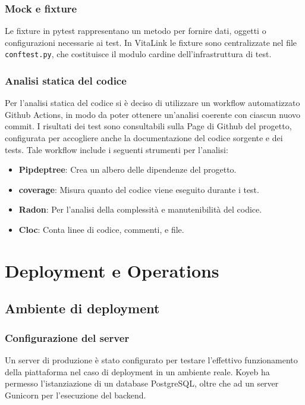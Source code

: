 \documentclass[12pt,a4paper,oneside]{report}
\begin{document}
\subsection{Mock e fixture}
Le fixture in pytest rappresentano un metodo per fornire dati, oggetti o configurazioni necessarie ai test.
In VitaLink le fixture sono centralizzate nel file \texttt{conftest.py}, che costituisce il modulo cardine dell'infrastruttura di test.
\subsection{Analisi statica del codice}
Per l'analisi statica del codice si è deciso di utilizzare un workflow automatizzato Github Actions, in modo da poter ottenere un'analisi coerente con ciascun nuovo commit.
I risultati dei test sono consultabili sulla Page di Github del progetto, configurata per accogliere anche la documentazione del codice sorgente e dei tests.
Tale workflow include i seguenti strumenti per l'analisi:
\begin{itemize}
    \item \textbf{Pipdeptree}: Crea un albero delle dipendenze del progetto.

    \item \textbf{coverage}: Misura quanto del codice viene eseguito durante i test.

    \item \textbf{Radon}: Per l’analisi della complessità e manutenibilità del codice.

    \item \textbf{Cloc}: Conta linee di codice, commenti, e file.
\end{itemize}

\chapter{Deployment e Operations}
\section{Ambiente di deployment}
\subsection{Configurazione del server}
Un server di produzione è stato configurato per testare l'effettivo funzionamento della piattaforma nel caso di deployment in un ambiente reale.
Koyeb \cite{koyeb} ha permesso l'istanziazione di un database PostgreSQL, oltre che ad un server Gunicorn per l'esecuzione del backend.
\end{document}
